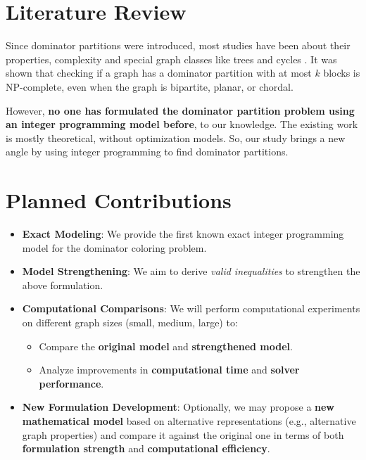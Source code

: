 \documentclass[12pt]{article}
\begin{document}
\section{Literature Review}

Since dominator partitions were introduced, most studies have been about their properties, complexity and special graph classes like trees and cycles \cite{dominator_partitions}. It was shown that checking if a graph has a dominator partition with at most $k$ blocks is NP-complete, even when the graph is bipartite, planar, or chordal.

However, \textbf{no one has formulated the dominator partition problem using an integer programming model before}, to our knowledge. The existing work is mostly theoretical, without optimization models. So, our study brings a new angle by using integer programming to find dominator partitions.




\section{Planned Contributions}
\begin{itemize}[leftmargin=*, noitemsep]
    \item \textbf{Exact Modeling}: We provide the first known exact integer programming model for the dominator coloring problem.
    \item \textbf{Model Strengthening}: We aim to derive \textit{valid inequalities} to strengthen the above formulation.
    \item \textbf{Computational Comparisons}: We will perform computational experiments on different graph sizes (small, medium, large) to:
    \begin{itemize}[noitemsep]
        \item Compare the \textbf{original model} and \textbf{strengthened model}.
        \item Analyze improvements in \textbf{computational time} and \textbf{solver performance}.
    \end{itemize}
    \item \textbf{New Formulation Development}: Optionally, we may propose a \textbf{new mathematical model} based on alternative representations (e.g., alternative graph properties) and compare it against the original one in terms of both \textbf{formulation strength} and \textbf{computational efficiency}.
\end{itemize}
\end{document}
